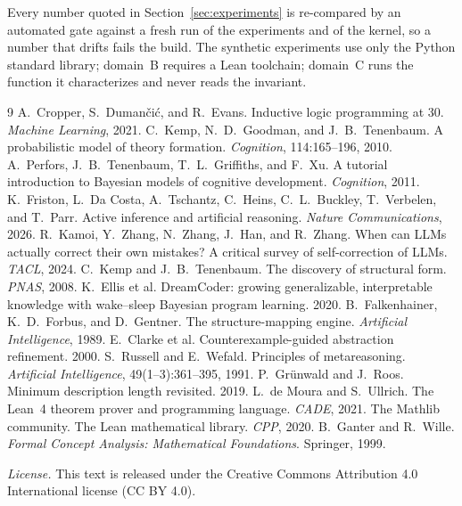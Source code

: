 \documentclass[11pt]{article}
\begin{document}
Every number quoted in Section~\ref{sec:experiments} is re-compared by an automated gate against a fresh run
of the experiments and of the kernel, so a number that drifts fails the build. The synthetic
experiments use only the Python standard library; domain~B requires a Lean toolchain; domain~C runs the
function it characterizes and never reads the invariant.
\begin{thebibliography}{9}
\small
{} A.~Cropper, S.~Duman\v{c}i\'c, and R.~Evans.
  Inductive logic programming at 30. \emph{Machine Learning}, 2021.
 C.~Kemp, N.~D.~Goodman, and J.~B.~Tenenbaum.
  A probabilistic model of theory formation. \emph{Cognition}, 114:165--196, 2010.
 A.~Perfors, J.~B.~Tenenbaum, T.~L.~Griffiths, and F.~Xu.
  A tutorial introduction to Bayesian models of cognitive development. \emph{Cognition}, 2011.
 K.~Friston, L.~Da Costa, A.~Tschantz, C.~Heins, C.~L.~Buckley, T.~Verbelen,
  and T.~Parr. Active inference and artificial reasoning. \emph{Nature Communications}, 2026.
 R.~Kamoi, Y.~Zhang, N.~Zhang, J.~Han, and R.~Zhang.
  When can LLMs actually correct their own mistakes? A critical survey of self-correction of LLMs.
  \emph{TACL}, 2024.
 C.~Kemp and J.~B.~Tenenbaum. The discovery of structural form.
  \emph{PNAS}, 2008.
 K.~Ellis et al. DreamCoder: growing generalizable, interpretable knowledge
  with wake--sleep Bayesian program learning. 2020.
 B.~Falkenhainer, K.~D.~Forbus, and D.~Gentner.
  The structure-mapping engine. \emph{Artificial Intelligence}, 1989.
 E.~Clarke et al. Counterexample-guided abstraction refinement. 2000.
 S.~Russell and E.~Wefald. Principles of metareasoning.
  \emph{Artificial Intelligence}, 49(1--3):361--395, 1991.
 P.~Gr\"unwald and J.~Roos. Minimum description length revisited. 2019.
  L.~de Moura and S.~Ullrich. The Lean~4 theorem prover and programming language.
  \emph{CADE}, 2021.
  The Mathlib community. The Lean mathematical library. \emph{CPP}, 2020.
 B.~Ganter and R.~Wille. \emph{Formal Concept Analysis: Mathematical
  Foundations}. Springer, 1999.
\normalsize
\end{thebibliography}


\vspace{1em}
\noindent\small\textit{License.} This text is released under the Creative Commons Attribution 4.0
International license (CC BY 4.0).
\end{document}

